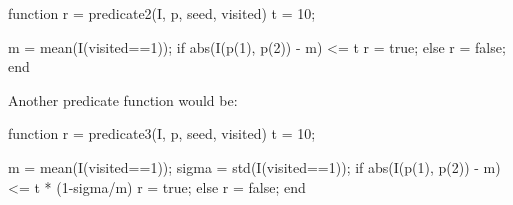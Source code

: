 \begin{matlab}
function r = predicate2(I, p, seed, visited)
t = 10;

m = mean(I(visited==1));
if abs(I(p(1), p(2)) - m) <= t
    r = true;
else
    r = false;
end
\end{matlab}


Another predicate function would be:
\begin{matlab}
function r = predicate3(I, p, seed, visited)
t = 10;

m = mean(I(visited==1));
sigma = std(I(visited==1));
if abs(I(p(1), p(2)) - m) <= t * (1-sigma/m)
    r = true;
else
    r = false;
end
\end{matlab}

\begin{figure}[htbp]
\centering
{}\hfill
{}


\end{figure}
